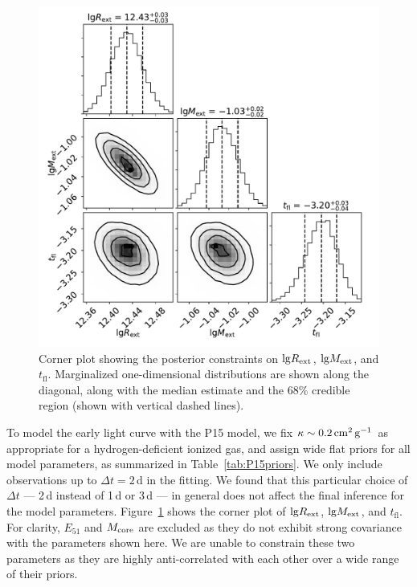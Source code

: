 \documentclass[twocolumn]{aastex63}
\begin{document}
\begin{CJK*}{UTF8}{gbsn}
\begin{figure}[htbp!]
	\centering
	\includegraphics[width=\columnwidth]{figures/corner_P15.pdf}
	\caption{Corner plot showing the posterior constraints on ${\rm lg}R_{\rm ext}$, ${\rm lg}M_{\rm 
			ext}$, and $t_\mathrm{fl}$. Marginalized one-dimensional distributions are shown along the 
		diagonal, along with the median estimate and the 68\% credible region (shown with vertical 
		dashed 
		lines).	\label{fig:pirocorner}}
\end{figure}
To model the early light curve with the P15 model, we fix $\kappa\sim0.2\,{\rm cm^2\, g^{-1}}$ as 
appropriate for a hydrogen-deficient ionized gas, and assign wide flat priors for all model parameters, 
as summarized in Table~\ref{tab:P15priors}. We only include observations up to $\Delta t = 2$\,d in 
the fitting. We found that this particular choice of $\Delta t$ --- 2\,d instead of 1\,d or 3\,d --- in 
general does not affect the final inference for the model parameters. Figure~\ref{fig:pirocorner} shows 
the corner plot of ${\rm lg}R_{\rm ext}$, ${\rm lg}M_{\rm 	ext}$, and $t_\mathrm{fl}$. For clarity, 
$E_{51}$ and $M_{\rm core}$ are excluded as they do not exhibit strong covariance with the 
parameters shown here. We are unable to constrain these two parameters as they are highly 
anti-correlated with each other over a wide range of their priors.


\end{CJK*}
\end{document}
